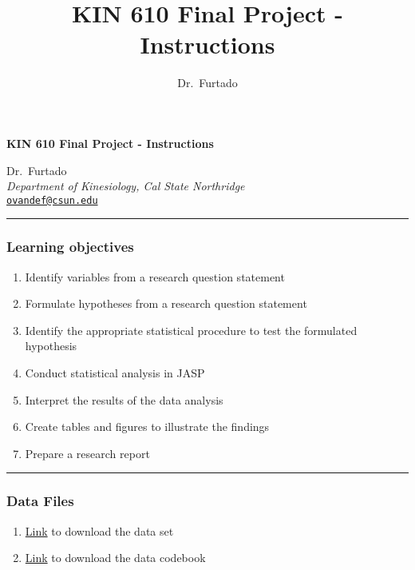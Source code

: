 \documentclass[11pt,]{article}
\title{KIN 610 \textbar{} Final Project - Instructions}
\author{Dr.~Furtado}
\date{}
\newcommand{\blankline}{\quad\pagebreak[2]}
\providecommand{\tightlist}{%
  \setlength{\itemsep}{0pt}\setlength{\parskip}{0pt}}
\begin{document}
  



\thispagestyle{plain} 

\begin{flushleft}\Large \bf KIN 610 \textbar{} Final Project -
Instructions  \end{flushleft}
	\vspace{1 mm}   
Dr.~Furtado \\
\emph{Department of Kinesiology, Cal State Northridge} \\
\texttt{\href{mailto:ovandef@csun.edu}{\nolinkurl{ovandef@csun.edu}}}   \\

  

\hrule

\vspace{6 mm}
	


\hypertarget{learning-objectives}{%
\subsubsection{Learning objectives}\label{learning-objectives}}

\begin{enumerate}
\def\labelenumi{\arabic{enumi}.}
\tightlist
\item
  Identify variables from a research question statement
\item
  Formulate hypotheses from a research question statement
\item
  Identify the appropriate statistical procedure to test the formulated
  hypothesis
\item
  Conduct statistical analysis in JASP
\item
  Interpret the results of the data analysis
\item
  Create tables and figures to illustrate the findings
\item
  Prepare a research report
\end{enumerate}

\begin{center}\rule{0.5\linewidth}{0.5pt}\end{center}

\hypertarget{data-files}{%
\subsubsection{Data Files}\label{data-files}}

\begin{enumerate}
\def\labelenumi{\arabic{enumi}.}
\tightlist
\item
  \href{https://osf.io/bf58v/}{Link} to download the data set
\item
  \href{https://osf.io/sg46v/}{Link} to download the data codebook
\end{enumerate}
\end{document}

